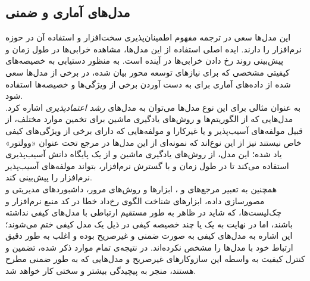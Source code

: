 \subsection{مدل‌های آماری و ضمنی}
این مدل‌ها سعی در ترجمه مفهوم اطمینان‌پذیری سخت‌افزار و استفاده آن در حوزه نرم‌افزار را دارند. ایده اصلی استفاده از این مدل‌ها، مشاهده خرابی‌ها در طول زمان و پیش‌بینی روند رخ دادن خرابی‌ها در آینده است. به منظور دستیابی به خصیصه‌های کیفیتی مشخصی که برای نیازهای توسعه محور بیان شده، در برخی از مدل‌ها سعی شده از داده‌های آماری برای به دست آوردن برخی از ویژگی‌ها و خصیصه‌ها استفاده شود.\\
به عنوان مثالی برای این نوع مدل‌ها می‌توان به مدل‌های
\textit{رشد اعتمادپذیری}
\cite{musa_software_2004}
اشاره کرد. مدل‌هایی که از الگوریتم‌ها و روش‌های یادگیری ماشین برای تخمین موارد مختلف، از قبیل مولفه‌های آسیب‌پذیر و یا غیرکارا و مولفه‌هایی که دارای برخی از ویژگی‌های کیفی خاص نیستند نیز از این نوع‌اند که نمونه‌ای از این مدل‌ها در مرجع
\cite{neuhaus_predicting_2007}
تحت عنوان «وولتور»
یاد شده؛ این مدل، از روش‌های یادگیری ماشین و از یک پایگاه دانش آسیب‌پذیری استفاده می‌کند تا در طول زمان و با گسترش نرم‌افزار، بتواند مولفه‌های آسیب‌پذیر نرم‌افزار را پیش‌بینی کند.\\
همچنین به تعبیر مرجع‌های
\cite{sommerville_software_2016}
و
\cite{wagner_software_2013}،
ابزارها و روش‌های مرور، داشبوردهای مدیریتی و مصورسازی داده، ابزارهای شناخت الگوی رخ‌داد خطا در کد منبع نرم‌افزار و چک‌لیست‌ها، که شاید در ظاهر به طور مستقیم ارتباطی با مدل‌های کیفی نداشته باشند، اما در نهایت به یک یا چند خصیصه کیفی در ذیل یک مدل کیفی ختم می‌شوند؛ این اشاره به مدل‌های کیفی به صورت ضمنی و غیرصریح بوده و اغلب به طور دقیق ارتباط خود با مدل‌ها را مشخص نکرده‌اند. در نتیجه‌ی ‌تمام موارد ذکر شده، تضمین و کنترل کیفیت به واسطه این سازوکارهای غیرصریح و مدل‌هایی که به طور ضمنی مطرح هستند، منجر به پیچیدگی بیشتر و سختی کار خواهد شد.


